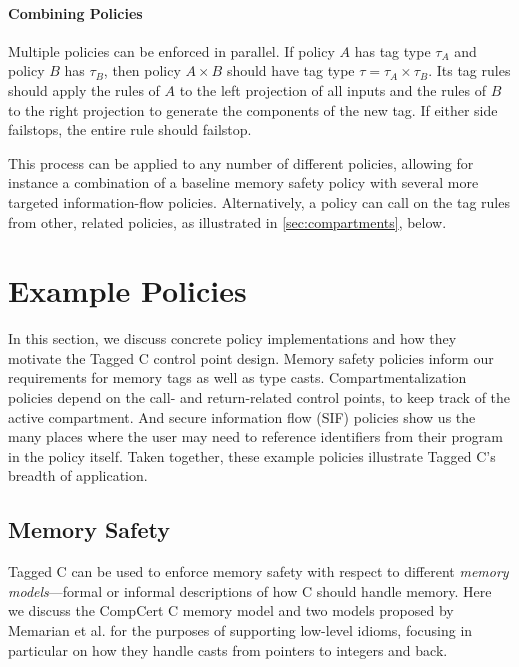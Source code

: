 \documentclass{llncs}
\begin{document}

\paragraph*{Combining Policies}

Multiple policies can be enforced in parallel. If policy \(A\) has tag type \(\tau_A\)
and policy \(B\) has \(\tau_B\), then policy \(A \times B\) should have tag type
\(\tau = \tau_A \times \tau_B\). Its tag rules should apply the rules of \(A\) to
the left projection of all inputs and the rules of \(B\) to the right projection
to generate the components of the new tag. If either side failstops, the entire
rule should failstop.

This process can be applied to any number of different policies, allowing for instance
a combination of a baseline memory safety policy with several more targeted
information-flow policies. Alternatively, a policy can call on the tag rules
from other, related policies, as illustrated in \cref{sec:compartments}, below.

\section{Example Policies}
\label{sec:policies}

In this section, we discuss concrete policy implementations and how 
they motivate the Tagged C control point design. Memory safety policies
inform our requirements for memory tags as well as type casts. Compartmentalization
policies depend on the call- and return-related control points, to keep track of the
active compartment. And secure information flow (SIF) policies show us the many places
where the user may need to reference identifiers from their program in the policy itself.
Taken together, these example policies illustrate Tagged C's breadth of application.

\subsection{Memory Safety}
\label{sec:memsafe}

Tagged C can be used to enforce memory safety with respect to different {\em memory models}---formal
or informal descriptions of how C should handle memory. Here we discuss the CompCert C
memory model and two models proposed by Memarian et al. \cite{Memarian19:ExploringCSemantics}
for the purposes of supporting low-level idioms, focusing in particular on how they handle
casts from pointers to integers and back.
\end{document}
